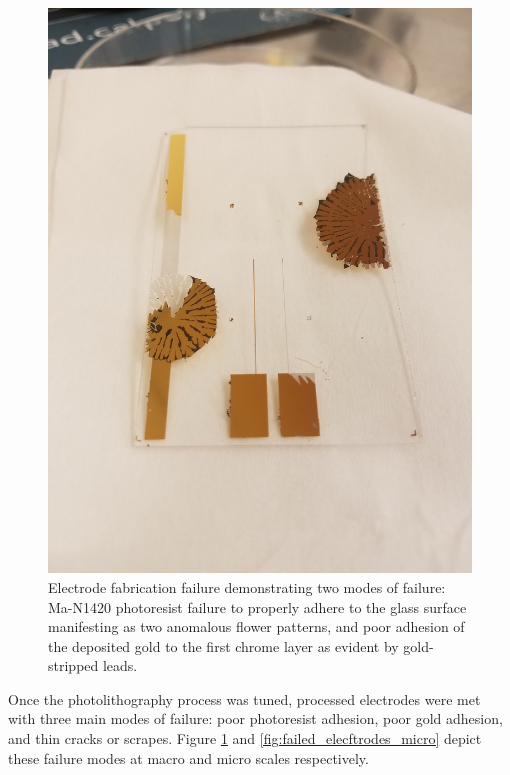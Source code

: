 \begin{figure}[h]
    \centering
    \includegraphics[width=\textwidth]{images/adhesion_issues.jpg}
    \caption[Electrode fabrication failure modes.]{Electrode fabrication failure demonstrating two modes of failure: Ma-N1420 photoresist failure to properly adhere to the glass surface manifesting as two anomalous flower patterns, and poor adhesion of the deposited gold to the first chrome layer as evident by gold-stripped leads.}
    \label{fig:failed_electrode_macro}
\end{figure}

\par Once the photolithography process was tuned, processed electrodes were met with three main modes of failure: poor photoresist adhesion, poor gold adhesion, and thin cracks or scrapes. Figure \ref{fig:failed_electrode_macro} and \ref{fig:failed_elecftrodes_micro}  depict these failure modes at macro and micro scales respectively.


